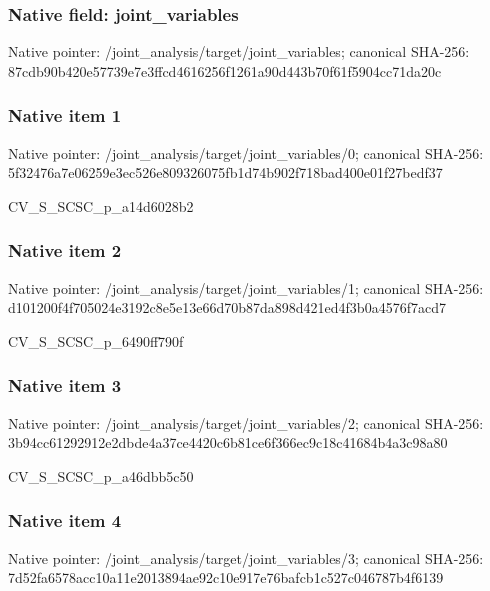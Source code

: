\documentclass[10pt,a4paper]{article}
\begin{document}
\subsubsection{Native field: joint\_variables}


Native pointer: /joint\_analysis/target/joint\_variables; canonical SHA-256: 87cdb90b420e57739e7e3ffc\allowbreak{}d4616256f1261a90d443b70f\allowbreak{}61f5904cc71da20c



\subsubsection{Native item 1}


Native pointer: /joint\_analysis/target/j\allowbreak{}oint\_variables/0; canonical SHA-256: 5f32476a7e06259e3ec526e8\allowbreak{}09326075fb1d74b902f718ba\allowbreak{}d400e01f27bedf37


CV\_S\_SCSC\_p\_a14d6028b2


\subsubsection{Native item 2}


Native pointer: /joint\_analysis/target/j\allowbreak{}oint\_variables/1; canonical SHA-256: d101200f4f705024e3192c8e\allowbreak{}5e13e66d70b87da898d421ed\allowbreak{}4f3b0a4576f7acd7


CV\_S\_SCSC\_p\_6490ff790f


\subsubsection{Native item 3}


Native pointer: /joint\_analysis/target/j\allowbreak{}oint\_variables/2; canonical SHA-256: 3b94cc61292912e2dbde4a37\allowbreak{}ce4420c6b81ce6f366ec9c18\allowbreak{}c41684b4a3c98a80


CV\_S\_SCSC\_p\_a46dbb5c50


\subsubsection{Native item 4}


Native pointer: /joint\_analysis/target/j\allowbreak{}oint\_variables/3; canonical SHA-256: 7d52fa6578acc10a11e20138\allowbreak{}94ae92c10e917e76bafcb1c5\allowbreak{}27c046787b4f6139
\end{document}
